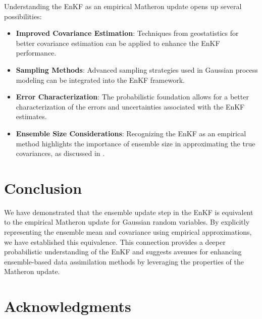 \documentclass{article}
\theoremstyle{plain}
\begin{document}
Understanding the EnKF as an empirical Matheron update opens up several possibilities:

\begin{itemize}
    \item \textbf{Improved Covariance Estimation}: Techniques from geostatistics for better covariance estimation can be applied to enhance the EnKF performance.
    \item \textbf{Sampling Methods}: Advanced sampling strategies used in Gaussian process modeling can be integrated into the EnKF framework.
    \item \textbf{Error Characterization}: The probabilistic foundation allows for a better characterization of the errors and uncertainties associated with the EnKF estimates.
    \item \textbf{Ensemble Size Considerations}: Recognizing the EnKF as an empirical method highlights the importance of ensemble size in approximating the true covariances, as discussed in \citet{Fearnhead2018Particle}.
\end{itemize}

\section{Conclusion}

We have demonstrated that the ensemble update step in the EnKF is equivalent to the empirical Matheron update for Gaussian random variables. By explicitly representing the ensemble mean and covariance using empirical approximations, we have established this equivalence. This connection provides a deeper probabilistic understanding of the EnKF and suggests avenues for enhancing ensemble-based data assimilation methods by leveraging the properties of the Matheron update.

\section*{Acknowledgments}




\end{document}
